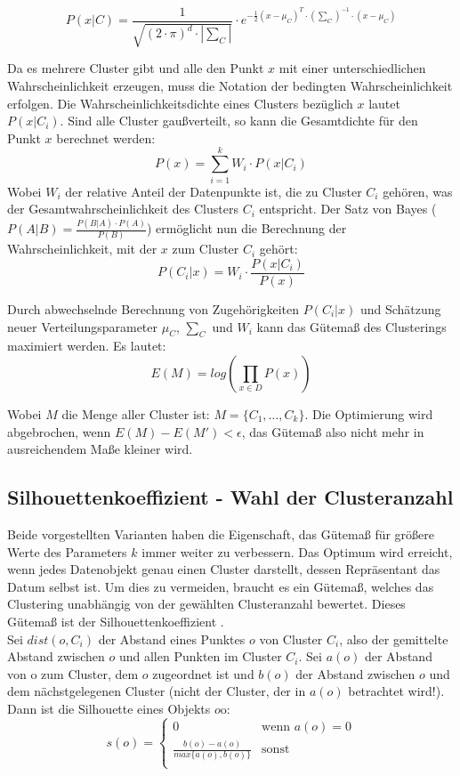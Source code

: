 \documentclass[11pt,fleqn]{book}
\begin{document}
$$P(x|C) = \frac{1}{\sqrt{(2\cdot \pi)^d \cdot |\sum_C|}} \cdot e^{-\frac{1}{2}(x - \mu_C)^T \cdot (\sum_C)^{-1} \cdot (x - \mu_C)}$$ 

Da es mehrere Cluster gibt und alle den Punkt $x$ mit einer unterschiedlichen Wahrscheinlichkeit erzeugen, muss die Notation der bedingten Wahrscheinlichkeit erfolgen. Die Wahrscheinlichkeitsdichte eines Clusters bezüglich $x$ lautet $P(x|C_i)$. Sind alle Cluster gaußverteilt, so kann die Gesamtdichte für den Punkt $x$ berechnet werden: $$P(x) = \sum_{i=1}^k W_i \cdot P(x|C_i)$$ 
Wobei $W_i$ der relative Anteil der Datenpunkte ist, die zu Cluster $C_i$ gehören, was der Gesamtwahrscheinlichkeit des Clusters $C_i$ entspricht. Der Satz von Bayes ($P(A|B) = \frac{P(B|A)\cdot P(A)}{P(B)}$) ermöglicht nun die Berechnung der Wahrscheinlichkeit, mit der $x$ zum Cluster $C_i$ gehört:
$$P(C_i|x) = W_i \cdot \frac{P(x|C_i)}{P(x)}$$

Durch abwechselnde Berechnung von Zugehörigkeiten $P(C_i|x)$ und Schätzung neuer Verteilungsparameter $\mu_C$, $\sum_C$ und $W_i$ kann das Gütemaß des Clusterings maximiert werden. Es lautet:
$$E(M) = log(\prod_{x \in D} P(x))$$

Wobei $M$ die Menge aller Cluster ist: $M = \{C_1, \dots, C_k\}$. Die Optimierung wird abgebrochen, wenn $E(M)-E(M')<\epsilon$, das Gütemaß also nicht mehr in ausreichendem Maße kleiner wird.

\subsection{Silhouettenkoeffizient - Wahl der Clusteranzahl}
Beide vorgestellten Varianten haben die Eigenschaft, das Gütemaß für größere Werte des Parameters $k$ immer weiter zu verbessern. Das Optimum wird erreicht, wenn jedes Datenobjekt genau einen Cluster darstellt, dessen Repräsentant das Datum selbst ist. Um dies zu vermeiden, braucht es ein Gütemaß, welches das Clustering unabhängig von der gewählten Clusteranzahl bewertet. Dieses Gütemaß ist der Silhouettenkoeffizient \cite{silh}.\\
Sei $dist(o,C_i)$ der Abstand eines Punktes $o$ von Cluster $C_i$, also der gemittelte Abstand zwischen $o$ und allen Punkten im Cluster $C_i$. Sei $a(o)$ der Abstand von o zum Cluster, dem $o$ zugeordnet ist und $b(o)$ der Abstand zwischen $o$ und dem nächstgelegenen Cluster (nicht der Cluster, der in $a(o)$ betrachtet wird!).
Dann ist die Silhouette eines Objekts $o$o:
\begin{equation}
   s(o) =
   \begin{cases}
     0 & \text{wenn } a(o) = 0\\
     \frac{b(o) - a(o)}{max\{a(o), b(o)\}} & \text{sonst} \\
   \end{cases}
\end{equation}
\end{document}
